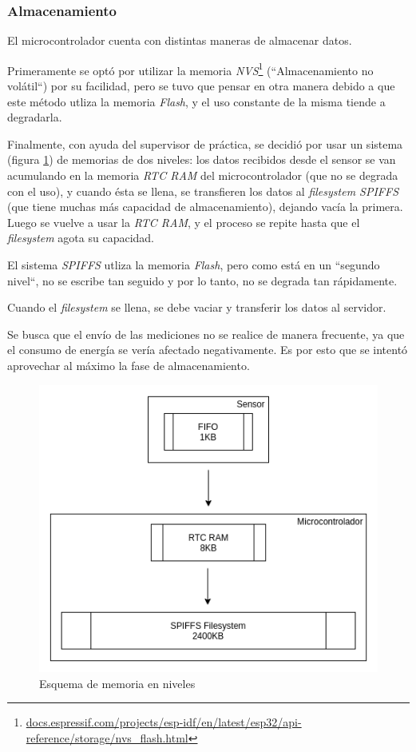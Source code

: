 \documentclass{article}
\newcommand{ \fnnvs }{\footnote{\url{docs.espressif.com/projects/esp-idf/en/latest/esp32/api-reference/storage/nvs_flash.html}}}
\begin{document}
    \subsubsection{Almacenamiento}
    El microcontrolador cuenta con distintas maneras de almacenar datos. \par
    Primeramente se optó por utilizar la memoria \emph{NVS}\fnnvs 
    (``Almacenamiento no volátil``) por su facilidad, pero se tuvo que pensar 
    en otra manera debido a que este método utliza la memoria \emph{Flash}, y 
    el uso constante de la misma tiende a degradarla. \par
    Finalmente, con ayuda del supervisor de práctica, se decidió por usar un 
    sistema (figura \ref{fig:memoria}) de memorias de dos niveles: los datos 
    recibidos desde el sensor se van acumulando en la memoria \emph{RTC RAM} 
    del microcontrolador (que no se degrada con el uso), y cuando ésta se 
    llena, se transfieren los datos al \emph{filesystem SPIFFS} (que tiene 
    muchas más capacidad de almacenamiento), dejando vacía la primera. 
    Luego se vuelve a usar la \emph{RTC RAM}, y el proceso se repite hasta 
    que el \emph{filesystem} agota su capacidad. \par
    El sistema \emph{SPIFFS} utliza la memoria \emph{Flash}, pero como está
    en un ``segundo nivel``, no se escribe tan seguido y por lo tanto, no 
    se degrada tan rápidamente. \par
    Cuando el \emph{filesystem} se llena, se debe vaciar y transferir los
    datos al servidor. \par
    Se busca que el envío de las mediciones no se realice de manera frecuente, 
    ya que el consumo de energía se vería afectado negativamente. Es por esto
    que se intentó aprovechar al máximo la fase de almacenamiento.

    \begin{figure}[h]
        \includegraphics[width=0.8 \textwidth, center]{../segundas/esquema_memoria.png}
        \caption{Esquema de memoria en niveles}
        \label{fig:memoria}
    \end{figure}
\end{document}
